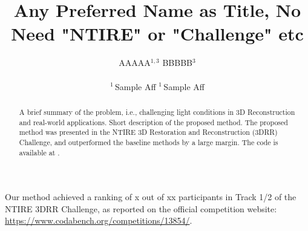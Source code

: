 \documentclass[10pt,twocolumn,letterpaper]{article}
\title{Any Preferred Name as Title, No Need "NTIRE" or "Challenge" etc}
\author{
AAAAA$^{1,3}$ \quad
BBBBB$^{3}$ \\ \\
$^{1}$\,Sample Aff \quad
$^{1}$\,Sample Aff
}
\begin{document}
\maketitle


\begin{abstract}
A brief summary of the problem, i.e., challenging light conditions in 3D Reconstruction and real-world applications. Short description of the proposed method. The proposed method was presented in the NTIRE 3D Restoration and Reconstruction (3DRR) Challenge, and outperformed the baseline methods by a large margin. The code is available at \url{}.
\end{abstract}

\begin{disclaimerbox}
Our method achieved a ranking of x out of xx participants in Track 1/2 of the NTIRE 3DRR Challenge, as reported on the official competition website: \url{https://www.codabench.org/competitions/13854/}.
\end{disclaimerbox}







{
    \small
    
    
}
\end{document}
